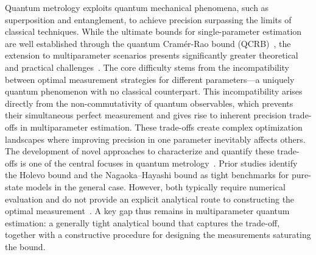 \documentclass[
aps,
prl,
twocolumn,

superscriptaddress]{revtex4-2}
\begin{document}
Quantum metrology exploits quantum mechanical phenomena, such as superposition and entanglement, to achieve precision surpassing the limits of classical techniques. While the ultimate bounds for single-parameter estimation are well established through the quantum Cramér-Rao bound (QCRB)~\cite{Hole82book,Hels76book,BrauC94,BrauCM96,Qiushi2023,Kurdzialek22}, the extension to multiparameter scenarios presents significantly greater theoretical and practical challenges~\cite{Szczykulska2016,Rafal2020,ALBARELLI2020126311,vidrighin2014,crowley2014,Yue2014,Zhang2014,Suzuki2016,Liu_2019,ChenHZ2019,Hou20minimal,HouSuper2021,Chen_2017,Luca2017,Kok2020,Liu2017,Roccia_2017,e22111197,singularqfim1,singularqfim2,singularqfim3,singularqfim4,singularqfim5}.
The core difficulty stems from the incompatibility between optimal measurement strategies for different parameters—a uniquely quantum phenomenon with no classical counterpart. This incompatibility arises directly from the non-commutativity of quantum observables, which prevents their simultaneous perfect measurement and gives rise to inherent precision trade-offs in multiparameter estimation. These trade-offs create complex optimization landscapes where improving precision in one parameter inevitably affects others. The development of novel approaches to characterize and quantify these trade-offs is one of the central focuses in quantum metrology~\cite{HongzhenPra,HongzhenPRL,GillM00,HayaM05,Zhu2018universally,Lu2021,Sidhu2021,Nagaoka1,Nagaoka2,Conlon2021,Ragy2016,Federico2021,Carollo_2019,Ragy2016,Candeloro_2021,MatsumotoThesis,Matsumoto_2002,Koichi2013,Kahn2009,Yuxiang2019,FrancescoPRL,Conlon2023,chen2024simultaneous}.
Prior studies identify the Holevo bound and the Nagaoka–Hayashi bound as tight benchmarks for pure-state models in the general case. However, both typically require numerical evaluation and do not provide an explicit analytical route to constructing the optimal measurement~\cite{Hole82book,Koichi2013,Kahn2009,Yuxiang2019,MatsumotoThesis,Matsumoto_2002,FrancescoPRL,Suzuki2016,Sidhu2021,Nagaoka1,Nagaoka2,Conlon2021}.
A key gap thus remains in multiparameter quantum estimation: a generally tight analytical bound that captures the trade-off, together with a constructive procedure for designing the measurements saturating the bound.
\end{document}
